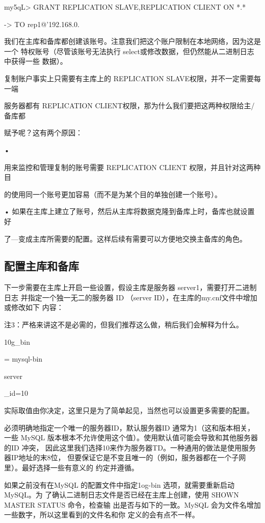 my5qL> GRANT REPLICATION SLAVE,REPLICATION CLIENT ON *.*

-> TO rep1@'192.168.0.%

我们在主库和备库都创建该账号。注意我们把这个账户限制在本地网络，因为这是一个
特权账号（尽管该账号无法执行 select或修改数据，但仍然能从二进制日志中获得一些
数据）。

复制账户事实上只需要有主库上的 REPLICATION SLAVE权限，并不一定需要每一端

服务器都有 REPLICATION CLIENT权限，那为什么我们要把这两种权限给主/备库都

赋予呢？这有两个原因：

•

用来监控和管理复制的账号需要 REPLICATION CLIENT 权限，并且针对这两种目

的使用同一个账号更加容易（而不是为某个目的单独创建一个账号）。

• 如果在主库上建立了账号，然后从主库将数据克隆到备库上时，备库也就设置好

了—变成主库所需要的配置。这样后续有需要可以方便地交换主备库的角色。

\subsection{配置主库和备库}
下一步需要在主库上开启一些设置，假设主库是服务器 server1，需要打开二进制日志
并指定一个独一无二的服务器 ID （server ID），在主库的my.cnf文件中增加或修改如下
内容：

注3：严格来讲这不是必需的，但我们推荐这么做，稍后我们会解释为什么。

10g\_bin

= mysql-bin

server

\_id=10

实际取值由你决定，这里只是为了简单起见，当然也可以设置更多需要的配置。

必须明确地指定一个唯一的服务器ID，默认服务器ID 通常为1（这和版本相关，一些
MySQL 版本根本不允许使用这个值）。使用默认值可能会导致和其他服务器的ID 冲突，
因此这里我们选择10来作为服务器TD。一种通用的做法是使用服务器IP地址的末8位，
但要保证它是不变且唯一的（例如，服务器都在一个子网里）。最好选择一些有意义的
约定并遵循。

如果之前没有在MySQL 的配置文件中指定1og-bin 选项，就需要重新启动 MySQL。为
了确认二进制日志文件是否已经在主库上创建，使用 SHOWN MASTER STATUS 命令，检查输
出是否与如下的一致。MySQL 会为文件名增加一些数字，所以这里看到的文件名和你
定义的会有点不一样。

